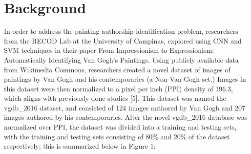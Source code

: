 \documentclass{article}
\begin{document}
\section{Background}


In order to address the painting authorship identification problem, researchers from the RECOD Lab at the University of Campinas, explored using CNN and SVM techniques in their paper From Impressionism to Expressionism: Automatically Identifying Van Gogh’s Paintings. Using publicly available data from Wikimedia Commons, researchers created a novel dataset of images of paintings by Van Gogh and his contemporaries (a Non-Van Gogh set.) Images in this dataset were then normalized to a pixel per inch (PPI) density of 196.3, which aligns with previously done studies [5]. This dataset was named the vgdb\_2016 dataset, and consisted of 124 images authored by Van Gogh and 207 images authored by his contemporaries. After the novel vgdb\_2016 database was normalized over PPI, the dataset was divided into a training and testing sets, with the training and testing sets consisting of 80\% and 20\% of the dataset respectively; this is summarized below in Figure 1:
\end{document}
